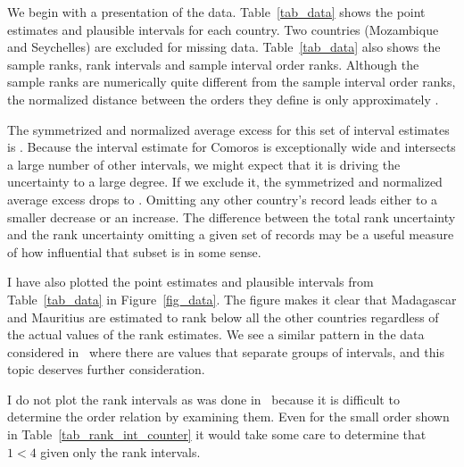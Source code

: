 \documentclass[12pt]{article}
\numberwithin{theorem}{section}
\begin{document}
We begin with a presentation of the data.  Table~\ref{tab_data} shows the point estimates and plausible intervals for each country.  Two countries (Mozambique and Seychelles) are excluded for missing data.  Table~\ref{tab_data} also shows the sample ranks, rank intervals and sample interval order ranks.  Although the sample ranks are numerically quite different from the sample interval order ranks, the normalized distance between the orders they define is only approximately \dataRankDistance.

The symmetrized and normalized average excess for this set of interval estimates is \dataUncertainty.  Because the interval estimate for Comoros is exceptionally wide and intersects a large number of other intervals, we might expect that it is driving the uncertainty to a large degree.  If we exclude it, the symmetrized and normalized average excess drops to \dataSubsetUncertainty.  Omitting any other country's record leads either to a smaller decrease or an increase.  The difference between the total rank uncertainty and the rank uncertainty omitting a given set of records may be a useful measure of how influential that subset is in some sense.

I have also plotted the point estimates and plausible intervals from Table~\ref{tab_data} in Figure~\ref{fig_data}.  The figure makes it clear that Madagascar and Mauritius are estimated to rank below all the other countries regardless of the actual values of the rank estimates.  We see a similar pattern in the data considered in~\cite{klein2020jointCR} where there are values that separate groups of intervals, and this topic deserves further consideration.

I do not plot the rank intervals as was done in~\cite{klein2020jointCR} because it is difficult to determine the order relation by examining them.  Even for the small order shown in Table~\ref{tab_rank_int_counter} it would take some care to determine that $1 < 4$ given only the rank intervals.



\end{document}
